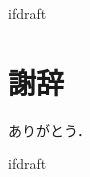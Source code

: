 \expandafter\ifx\csname ifdraft\endcsname\relax
 
\fi

\section*{謝辞}

ありがとう．

\expandafter\ifx\csname ifdraft\endcsname\relax
  
\fi
